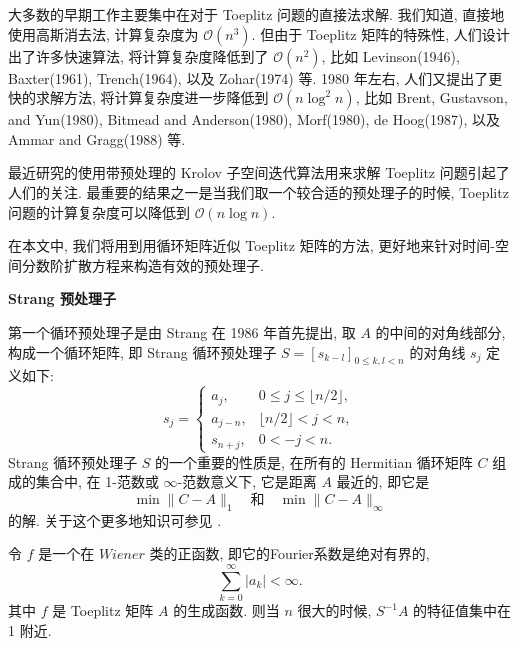 \documentclass{ecnumaster}
\begin{document}

大多数的早期工作主要集中在对于 Toeplitz 问题的直接法求解.
我们知道, 直接地使用高斯消去法, 计算复杂度为 $\mathcal{O}(n^3)$.
但由于 Toeplitz 矩阵的特殊性, 人们设计出了许多快速算法,
将计算复杂度降低到了 $\mathcal{O}(n^2)$,
比如 Levinson(1946)\cite{L46},
Baxter(1961)\cite{B61}, Trench(1964)\cite{T64}, 以及 Zohar(1974)\cite{Z74} 等.
1980 年左右, 人们又提出了更快的求解方法, 将计算复杂度进一步降低到 $\mathcal{O}(n\log ^2n)$,
比如 Brent, Gustavson, and Yun(1980)\cite{BGY80}, Bitmead and Anderson(1980)\cite{BA80},
Morf(1980)\cite{M80}, de Hoog(1987)\cite{H87},
以及 Ammar and Gragg(1988)\cite{AG88} 等.

最近研究的使用带预处理的 Krolov 子空间迭代算法用来求解 Toeplitz 问题引起了人们的关注.
最重要的结果之一是当我们取一个较合适的预处理子的时候,
Toeplitz 问题的计算复杂度可以降低到 $\mathcal{O}(n\log n)$.

在本文中, 我们将用到用循环矩阵近似 Toeplitz 矩阵的方法,
更好地来针对时间-空间分数阶扩散方程来构造有效的预处理子.

\medskip
\noindent\textbf{Strang 预处理子}

第一个循环预处理子是由 Strang\cite{S86} 在 1986 年首先提出,
取 $A$ 的中间的对角线部分, 构成一个循环矩阵,
即 Strang 循环预处理子 $S = [s_{k-l}]_{0\leq k,l < n}$ 的对角线 $s_j$ 定义如下:
\begin{equation}
  s_j =
  \begin{cases}
    a_j, & 0 \leq j \leq \lfloor n/2 \rfloor,\\
    a_{j-n}, & \lfloor n/2 \rfloor < j < n,\\
    s_{n+j}, & 0 < -j < n.
  \end{cases}
\end{equation}
Strang 循环预处理子 $S$ 的一个重要的性质是,
在所有的 Hermitian 循环矩阵 $C$ 组成的集合中,
在 1-范数或 $\infty$-范数意义下, 它是距离 $A$ 最近的, 即它是
$$
  \min\| C - A \|_1 \quad \text{和} \quad \min\| C - A \|_{\infty}
$$
的解. 关于这个更多地知识可参见 \cite{C89}.

\begin{theorem}\cite{C89,CS89}\label{the42}
令 $f$ 是一个在 $Wiener$ 类的正函数, 即它的Fourier系数是绝对有界的,
$$
  \sum_{k=0}^{\infty}|a_k| < \infty.
$$
其中 $f$ 是 Toeplitz 矩阵 $A$ 的生成函数. 则当 $n$ 很大的时候, $S^{-1}A$ 的特征值集中在 1 附近.
\end{theorem}
\end{document}
